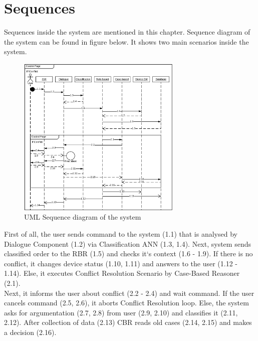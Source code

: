 \documentclass{llncs}
\begin{document}
    \section{Sequences}
    Sequences inside the system are mentioned in this chapter.
    Sequence diagram of the system can be found in figure below.
    It shows two main scenarios inside the system.\\
    \begin{figure}
        \includegraphics[width=0.7\textwidth]{UML.png}
        \caption[]{UML Sequence diagram of the system}
    \end{figure}
    First of all, the user sends command to the system (1.1) that is analysed by Dialogue Component (1.2) via Classification ANN (1.3, 1.4).
    Next, system sends classified order to the RBR (1.5) and checks it`s context (1.6 - 1.9).
    If there is no conflict, it changes device status (1.10, 1.11) and answers to the user (1.12 - 1.14).
    Else, it executes Conflict Resolution Scenario by Case-Based Reasoner (2.1).\\
    Next, it informs the user about conflict (2.2 - 2.4) and wait command.
    If the user cancels command (2.5, 2.6), it aborts Conflict Resolution loop.
    Else, the system asks for argumentation (2.7, 2.8) from user (2.9, 2.10) and classifies it (2.11, 2.12).
    After collection of data (2.13) CBR reads old cases (2.14, 2.15) and makes a decision (2.16).\\
\end{document}
